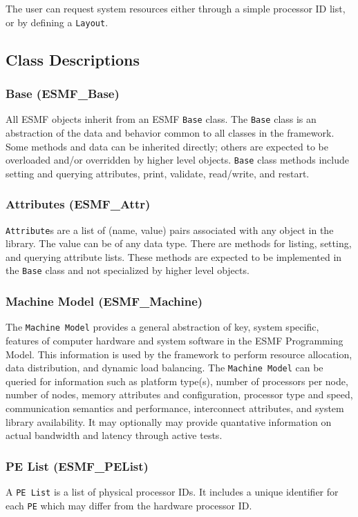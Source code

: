 The user can request system resources either through a simple processor
ID list, or by defining a {\tt Layout}.

\subsection{Class Descriptions}

\subsubsection{Base (ESMF\_Base)}
\label{sec:Base} 
All ESMF objects inherit from an ESMF {\tt Base} class.  
The {\tt Base} class is an abstraction of the data and behavior common to all
classes in the framework.  Some methods and data can be
inherited directly; others are expected to be overloaded and/or overridden by
higher level objects.  {\tt Base} class methods include setting and querying 
attributes, print, validate, read/write, and restart. 

\subsubsection{Attributes (ESMF\_Attr)}
\label{sec:Attr}
{\tt Attribute}s are a list of (name, value) pairs associated with any 
object in the library. The value can be of any data type. 
There are methods for listing, setting, and querying attribute lists.
These methods are expected to be implemented in the {\tt Base} class
and not specialized by higher level objects.

\subsubsection{Machine Model (ESMF\_Machine)} 
\label{sec:machine} 
The {\tt Machine Model} provides a general abstraction of 
key, system specific, features of computer hardware and system software in
the ESMF Programming Model.
This information is used by the framework to 
perform resource allocation, data distribution, and dynamic load balancing.  
The {\tt Machine Model} can be queried for information such as
platform type(s), number of processors per node, number of nodes, 
memory attributes and configuration, processor type and speed,
communication semantics and performance, 
interconnect attributes, and system library availability.
It may optionally may provide quantative information 
on actual bandwidth and latency through active tests.  

\subsubsection{PE List (ESMF\_PEList)}
\label{sec:pelist} 
A {\tt PE List} is a list of physical processor IDs.  It includes a 
unique identifier for each {\tt PE} which may differ from the hardware 
processor ID.  

